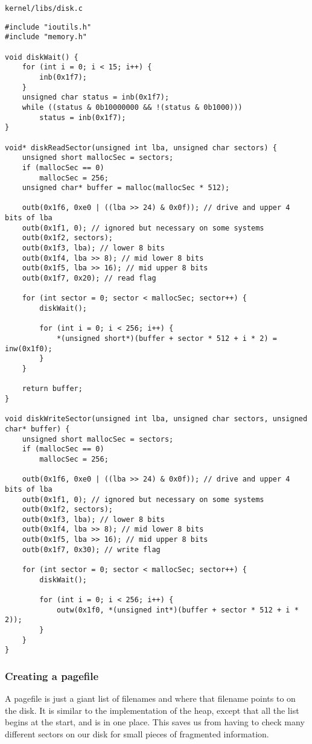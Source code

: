 \documentclass{article}
\begin{document}
\begin{verbatim}
kernel/libs/disk.c
\end{verbatim}
\begin{verbatim}
#include "ioutils.h"
#include "memory.h"

void diskWait() {
	for (int i = 0; i < 15; i++) {
		inb(0x1f7);
	}
	unsigned char status = inb(0x1f7);
	while ((status & 0b10000000 && !(status & 0b1000)))
		status = inb(0x1f7);
}

void* diskReadSector(unsigned int lba, unsigned char sectors) {
	unsigned short mallocSec = sectors;
	if (mallocSec == 0)
		mallocSec = 256;
	unsigned char* buffer = malloc(mallocSec * 512);

	outb(0x1f6, 0xe0 | ((lba >> 24) & 0x0f)); // drive and upper 4 bits of lba
	outb(0x1f1, 0); // ignored but necessary on some systems
	outb(0x1f2, sectors);
	outb(0x1f3, lba); // lower 8 bits
	outb(0x1f4, lba >> 8); // mid lower 8 bits
	outb(0x1f5, lba >> 16); // mid upper 8 bits
	outb(0x1f7, 0x20); // read flag

	for (int sector = 0; sector < mallocSec; sector++) {
		diskWait();

		for (int i = 0; i < 256; i++) {
			*(unsigned short*)(buffer + sector * 512 + i * 2) = inw(0x1f0);
		}
	}

	return buffer;
}

void diskWriteSector(unsigned int lba, unsigned char sectors, unsigned char* buffer) {
	unsigned short mallocSec = sectors;
	if (mallocSec == 0)
		mallocSec = 256;

	outb(0x1f6, 0xe0 | ((lba >> 24) & 0x0f)); // drive and upper 4 bits of lba
	outb(0x1f1, 0); // ignored but necessary on some systems
	outb(0x1f2, sectors);
	outb(0x1f3, lba); // lower 8 bits
	outb(0x1f4, lba >> 8); // mid lower 8 bits
	outb(0x1f5, lba >> 16); // mid upper 8 bits
	outb(0x1f7, 0x30); // write flag

	for (int sector = 0; sector < mallocSec; sector++) {
		diskWait();

		for (int i = 0; i < 256; i++) {
			outw(0x1f0, *(unsigned int*)(buffer + sector * 512 + i * 2));
		}
	}
}
\end{verbatim}

\subsubsection{Creating a pagefile}

A pagefile is just a giant list of filenames and where that filename points
to on the disk. It is similar to the implementation of the heap, except that
all the list begins at the start, and is in one place. This saves us from
having to check many different sectors on our disk for small pieces of fragmented
information.
\end{document}
